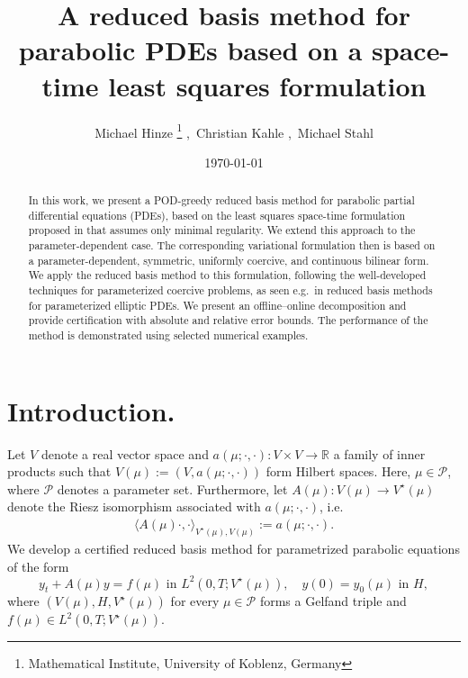 \documentclass{article}
\theoremstyle{plain}
\theoremstyle{definition}
\theoremstyle{remark}
\begin{document}
\title{A reduced basis method for parabolic PDEs based on a space-time least squares formulation}

\author{
Michael Hinze%
\footnote{Mathematical Institute, University of Koblenz, Germany}
,\,%
Christian Kahle%
\footnotemark[1]
,\,%
%
Michael Stahl%
\footnotemark[1]
}

\date{\today}



\maketitle

\begin{abstract}
In this work, we present a POD-greedy reduced basis method for parabolic partial differential equations (PDEs), based on the least squares space-time formulation proposed in \cite{preprint_SP} that assumes only minimal regularity. We extend this approach to the parameter-dependent case. The corresponding variational formulation then is based on a parameter-dependent, symmetric, uniformly coercive, and continuous bilinear form. We apply the reduced basis method to this formulation, following the well-developed techniques for parameterized coercive problems, as seen e.g.~in reduced basis methods for parameterized elliptic PDEs. We present an offline–online decomposition and provide certification with absolute and relative error bounds. The performance of the method is demonstrated using selected numerical examples.
\end{abstract}

\section{Introduction.}
Let $V$ denote a real vector space and $a(\mu;\cdot,\cdot): V\times V \rightarrow \mathbb{R}$ a family of inner products such that $V(\mu):= (V,a(\mu;\cdot,\cdot))$ form Hilbert spaces. Here, $\mu \in\mathcal P$, where $\mathcal P$ denotes a parameter set. Furthermore, let $A(\mu) : V(\mu) \rightarrow V^\star(\mu)$ denote the Riesz isomorphism associated with $a(\mu;\cdot,\cdot)$, i.e.
\begin{align}\label{bilinearform}
    \langle A(\mu) \cdot, \cdot \rangle_{V^\star(\mu), V(\mu)} := a(\mu; \cdot, \cdot).
\end{align}
We develop a certified reduced basis method for parametrized parabolic equations of the form
\begin{equation}\label{APDE}
y_t+A(\mu)y=f(\mu) \text{ in } L^2(0,T;V^\star(\mu)), \quad y(0)= y_0(\mu) \text{ in } H,
\end{equation}
where $(V(\mu),H,V^\star(\mu))$ for every $\mu \in \mathcal P$ forms a Gelfand triple and $f(\mu) \in L^2(0,T; V^\star(\mu))$.
\end{document}
